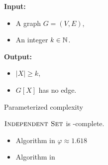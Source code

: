 \begin{frame}{\IS}
    \begin{minipage}{0.5\textwidth}
        \begin{alertblock}{\IS}
            \textbf{Input:}
            \begin{itemize}
                \item<2-> A graph $G = (V, E)$,
                \item<3-> An integer $k \in \mathbb{N}$.
            \end{itemize}

            \textbf{Output:}
            
            \begin{itemize}
                \item<5-> $|X| \geq k$,
                \item<6-> $G[X]$ has no edge.
            \end{itemize}
        \end{alertblock}
    \end{minipage}
    \begin{minipage}{0.45\textwidth}
        \centering
        

    \end{minipage}
\end{frame}

\begin{frame}{Parameterized complexity}
    \begin{center}
        $\textsc{Independent Set}$ is \NP-complete.
    \end{center}

    \vspace*{1cm}

    \begin{itemize}
        \item<2-> Algorithm in  \qquad $\varphi \approx 1.618$
        \item<3-> Algorithm in 
    \end{itemize}

    \vspace*{1cm}


\end{frame}

